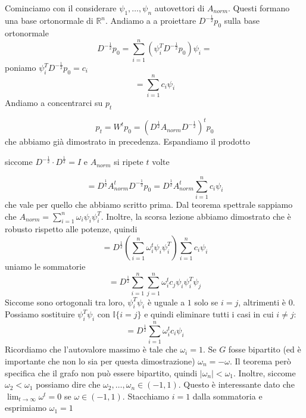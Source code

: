 \documentclass[12pt]{report}
\begin{document}
\begin{dimo}
    Cominciamo con il considerare $\psi_1,\dots,\psi_n$ autovettori di $A_{norm}$. Questi formano una base ortonormale di $\mathbb{R}^n$. Andiamo a a proiettare $D^{-\frac{1}{2}}p_0$ sulla base ortonormale
    $$D^{-\frac{1}{2}}p_0 = \sum_{i = 1}^n (\psi_i^T D^{-\frac{1}{2}}p_0) \psi_i =$$
    poniamo $\psi_i^T D^{-\frac{1}{2}}p_0 = c_i$
    $$=  \sum_{i = 1}^n c_i \psi_i$$
    Andiamo a concentrarci su $p_t$

    $$p_t = W^t p_0 = (D^\frac{1}{2} A_{norm} D^{-\frac{1}{2}})^t p_0$$
    che abbiamo già dimostrato in precedenza. Espandiamo il prodotto
    
    siccome $D^{-\frac{1}{2}} \cdot D^\frac{1}{2} = I$ e $A_{norm}$ si ripete $t$ volte

    $$= D^{\frac{1}{2}} A_{norm}^t D^{-\frac{1}{2}} p_0 = D^{\frac{1}{2}} A_{norm}^t \sum_{i = 1}^n c_i \psi_i$$
    che vale per quello che abbiamo scritto prima.
    Dal teorema spettrale sappiamo che $A_{norm} = \sum_{i = 1}^n \omega_i \psi_i \psi_i^T$. Inoltre, la scorsa lezione abbiamo dimostrato che è robusto rispetto alle potenze, quindi
    $$= D^{\frac{1}{2}} (\sum_{i = 1}^n \omega_i^t \psi_i \psi_i^T) \sum_{i = 1}^n c_i \psi_i$$
    uniamo le sommatorie
    $$= D^{\frac{1}{2}} \sum_{i = 1}^n \sum_{j = 1}^n \omega_i^t c_j \psi_i \psi_i^T \psi_j$$
    Siccome sono ortogonali tra loro, $\psi_i^T \psi_i$ è uguale a $1$ solo se $i = j$, altrimenti è $0$. Possiamo sostituire $\psi_i^T \psi_i$ con $\mathds{I}\{i=j\}$ e quindi eliminare tutti i casi in cui $i \neq j$:
    $$= D^{\frac{1}{2}} \sum_{i = 1}^n \omega_i^t c_i \psi_i$$
    Ricordiamo che l'autovalore massimo è tale che $\omega_i = 1$. Se $G$ fosse bipartito (ed è importante che non lo sia per questa dimostrazione) $\omega_n = - \omega$. Il teorema però specifica che il grafo non può essere bipartito, quindi $|\omega_n| < \omega_1$. Inoltre, siccome $\omega_2 < \omega_1$ possiamo dire che $\omega_2,\dots,\omega_n \in (-1,1)$. Questo è interessante dato che $\lim_{t \rightarrow \infty} \omega^t = 0$ se $\omega \in (-1,1)$. Stacchiamo $i = 1$ dalla sommatoria e esprimiamo $\omega_1 = 1$


\end{dimo}
\end{document}

